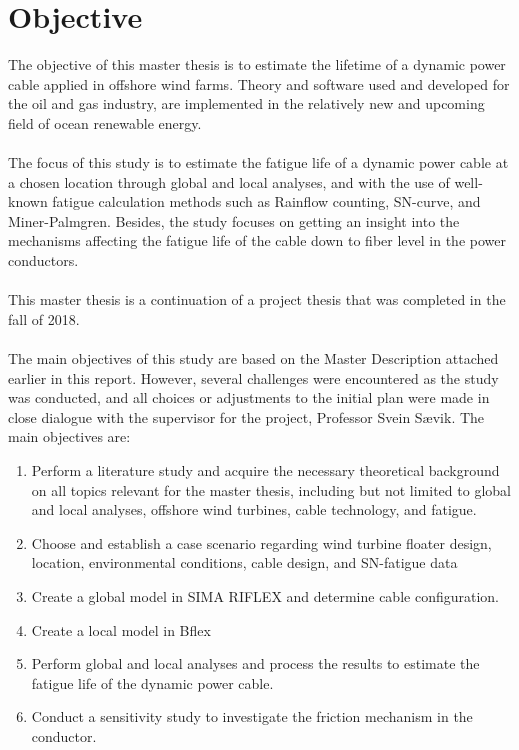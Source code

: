 \section{Objective}
The objective of this master thesis is to estimate the lifetime of a dynamic power cable applied in offshore wind farms.  Theory and software used and developed for the oil and gas industry, are implemented in the relatively new and upcoming field of ocean renewable energy.\\\\
The focus of this study is to estimate the fatigue life of a dynamic power cable at a chosen location through global and local analyses, and with the use of well-known fatigue calculation methods such as Rainflow counting, SN-curve, and Miner-Palmgren.  Besides, the study focuses on getting an insight into the mechanisms affecting the fatigue life of the cable down to fiber level in the power conductors. \\\\
This master thesis is a continuation of a project thesis that was completed in the fall of 2018.\\\\
The main objectives of this study are based on the Master Description attached earlier in this report. However,  several challenges were encountered as the study was conducted, and all choices or adjustments to the initial plan were made in close dialogue with the supervisor for the project, Professor Svein Sævik. The main objectives are:
\begin{enumerate}
    \item Perform a literature study and acquire the necessary theoretical background on all topics relevant for the master thesis, including but not limited to global and local analyses, offshore wind turbines, cable technology, and fatigue.
    \item Choose and establish a case scenario regarding wind turbine floater design, location, environmental conditions, cable design, and SN-fatigue data
    \item Create a global model in SIMA RIFLEX and determine cable configuration. 
    \item Create a local model in Bflex
    \item Perform global and local analyses and process the results to estimate the fatigue life of the dynamic power cable.
    \item Conduct a sensitivity study to investigate the friction mechanism in the conductor.  
\end{enumerate} 

